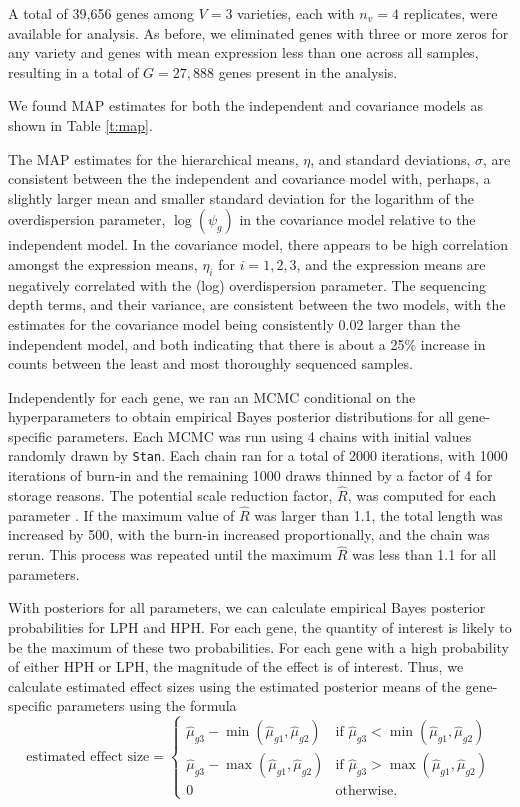\documentclass[useAMS,usenatbib,referee]{biom}
\begin{document}
A total of 39,656 genes among $V=3$ varieties, each with $n_v=4$ replicates, were available for analysis. As before, we eliminated genes with three or more zeros for any variety and genes with mean expression less than one across all samples, resulting in a total of $G=27,888$ genes present in the analysis. 

We found MAP estimates for both the independent and covariance models as shown in Table \ref{t:map}. 

The MAP estimates for the hierarchical means, $\eta$, and standard deviations, $\sigma$, are consistent between the the independent and covariance model with, perhaps, a slightly larger mean and smaller standard deviation for the logarithm of the overdispersion parameter, $\log(\psi_g)$ in the covariance model relative to the independent model. In the covariance model, there appears to be high correlation amongst the expression means, $\eta_i$ for $i=1,2,3$, and the expression means are negatively correlated with the (log) overdispersion parameter. The sequencing depth terms, and their variance, are consistent between the two models, with the estimates for the covariance model being consistently 0.02 larger than the independent model, and both indicating that there is about a 25\% increase in counts between the least and most thoroughly sequenced samples. 

Independently for each gene, we ran an MCMC conditional on the hyperparameters to obtain empirical Bayes posterior distributions for all gene-specific parameters. Each MCMC was run using 4 chains with initial values randomly drawn by {\tt Stan}. Each chain ran for a total of 2000 iterations, with 1000 iterations of burn-in and the remaining 1000 draws thinned by a factor of 4 for storage reasons. The potential scale reduction factor, $\hat{R}$, was computed for each parameter \citep{Gelm:Rubi:infe:1992, Broo:Gelm:gene:1997}. If the maximum value of $\hat{R}$ was larger than 1.1, the total length was increased by 500, with the burn-in increased proportionally, and the chain was rerun. This process was repeated until the maximum $\hat{R}$ was less than 1.1 for all parameters.

With posteriors for all parameters, we can calculate empirical Bayes posterior probabilities for LPH and HPH. For each gene, the quantity of interest is likely to be the maximum of these two probabilities. For each gene with a high probability of either HPH or LPH, the magnitude of the effect is of interest. Thus, we calculate estimated effect sizes using the estimated posterior means of the gene-specific parameters using the formula 
\begin{equation}
\mbox{estimated effect size} = \left\{ 
\begin{array}{ll}
\hat{\mu}_{g3} - \min(\hat{\mu}_{g1},\hat{\mu}_{g2}) & \mbox{if } \hat{\mu}_{g3} < \min(\hat{\mu}_{g1},\hat{\mu}_{g2}) \\
\hat{\mu}_{g3} - \max(\hat{\mu}_{g1},\hat{\mu}_{g2}) & \mbox{if } \hat{\mu}_{g3} > \max(\hat{\mu}_{g1},\hat{\mu}_{g2}) \\
0 & \mbox{otherwise}.
\end{array} 
\right. 
\label{e:effect_size}
\end{equation}
\end{document}
